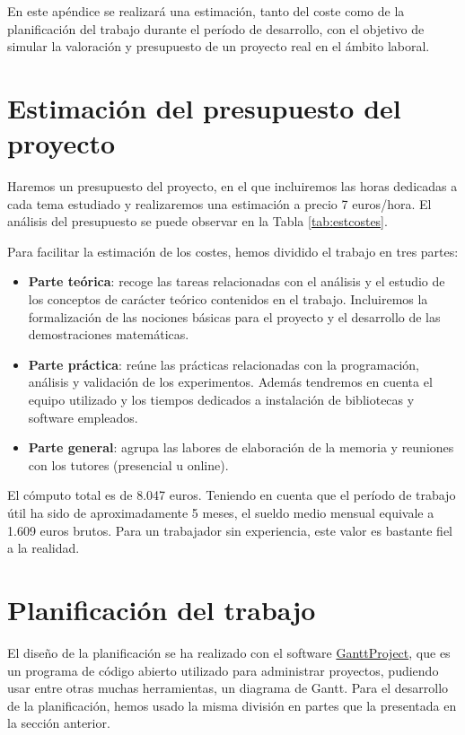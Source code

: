 En este apéndice se realizará una estimación, tanto del coste como de la planificación del trabajo durante el período de desarrollo, con el objetivo de simular la valoración y presupuesto de un proyecto real en el ámbito laboral.

\section*{Estimación del presupuesto del proyecto}

Haremos un presupuesto del proyecto, en el que incluiremos las horas dedicadas a cada tema estudiado y realizaremos una estimación a precio 7 euros/hora. El análisis del presupuesto se puede observar en la Tabla \ref{tab:estcostes}.

Para facilitar la estimación de los costes, hemos dividido el trabajo en tres partes:

\begin{itemize}
    \item \textbf{Parte teórica}: recoge las tareas relacionadas con el análisis y el estudio de los conceptos de carácter teórico contenidos en el trabajo. Incluiremos la formalización de las nociones básicas para el proyecto y el desarrollo de las demostraciones matemáticas.
    \item \textbf{Parte práctica}: reúne las prácticas relacionadas con la programación, análisis y validación de los experimentos. Además tendremos en cuenta el equipo utilizado y los tiempos dedicados a instalación de bibliotecas y software empleados.
    \item \textbf{Parte general}: agrupa las labores de elaboración de la memoria y reuniones con los tutores (presencial u online).
\end{itemize}

El cómputo total es de 8.047 euros. Teniendo en cuenta que el período de trabajo útil ha sido de aproximadamente 5 meses, el sueldo medio mensual equivale a 1.609 euros brutos. Para un trabajador sin experiencia, este valor es bastante fiel a la realidad.

\section*{Planificación del trabajo}

El diseño de la planificación se ha realizado con el software \href{https://www.ganttproject.biz}{GanttProject}, que es un programa de código abierto utilizado para administrar proyectos, pudiendo usar entre otras muchas herramientas, un diagrama de Gantt. Para el desarrollo de la planificación, hemos usado la misma división en partes que la presentada en la sección anterior.

